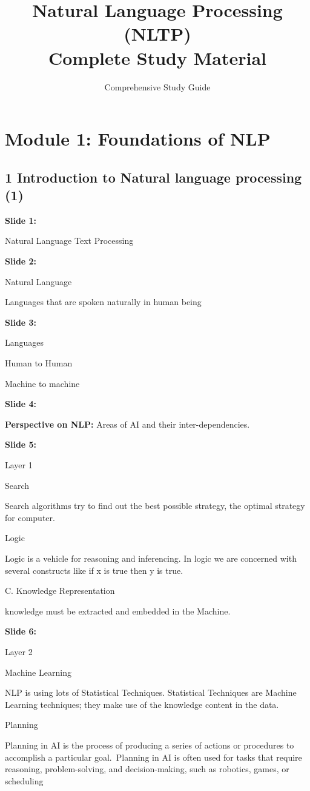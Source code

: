 \documentclass[11pt,a4paper]{article}
\title{\textbf{Natural Language Processing (NLTP)\\Complete Study Material}}
\author{Comprehensive Study Guide}
\date{}
\begin{document}
\maketitle
\tableofcontents
\newpage


\section{Module 1: Foundations of NLP}


\subsection{1 Introduction to Natural language processing (1)}

\textbf{Slide 1:}

Natural Language Text Processing

\textbf{Slide 2:}

Natural Language

Languages that  are spoken  naturally in  human being

\textbf{Slide 3:}

Languages

Human to Human

Machine to machine

\textbf{Slide 4:}

\textbf{Perspective on  NLP:} Areas of AI and their inter-dependencies.

\textbf{Slide 5:}

Layer 1

Search

Search algorithms try to find out the best possible strategy, the optimal strategy for computer.

Logic

Logic is a vehicle for reasoning and inferencing. In logic we are concerned with several constructs like if x is true then y is true.

C. Knowledge Representation

knowledge must be extracted and embedded in the Machine.

\textbf{Slide 6:}

Layer 2

Machine Learning

NLP is using lots of Statistical Techniques. Statistical Techniques are Machine Learning techniques; they make use of the knowledge content in the data.

Planning

Planning in AI is the process of producing a series of actions or procedures to accomplish a particular goal. Planning in AI is often used for tasks that require reasoning, problem-solving, and decision-making, such as robotics, games, or scheduling
\end{document}
